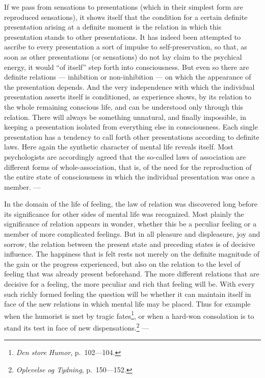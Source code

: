 \documentclass[12pt]{article}
\newcommand{\opage}[1]{\marginnote{\footnotesize\textit{[#1]}}}
\begin{document}
If we pass from sensations to presentations (which in their simplest form
are reproduced sensations), it shows itself that the condition for a certain
definite presentation arising at a definite moment is the relation in which
this presentation stands to other presentations. \opage{19}It has indeed been
attempted to ascribe to every presentation a sort of impulse to
self-preservation, so that, as soon as other presentations (or sensations)
do not lay claim to the psychical energy, it would ``of itself'' step forth
into consciousness. But even so there are definite relations --- inhibition
or non-inhibition --- on which the appearance of the presentation depends.
And the very independence with which the individual presentation asserts
itself is conditioned, as experience shows, by its relation to the whole
remaining conscious life, and can be understood only through this relation.
There will always be something unnatural, and finally impossible, in keeping
a presentation isolated from everything else in consciousness. Each single
presentation has a tendency to call forth other presentations according to
definite laws. Here again the synthetic character of mental life reveals
itself. Most psychologists are accordingly agreed that the so-called laws of
association are different forms of whole-association, that is, of the need
for the reproduction of the entire state of consciousness in which the
individual presentation was once a member. ---

In the domain of the life of feeling, the law of relation was discovered
long before its significance for other sides of mental life was recognized.
Most plainly the significance of relation appears in wonder, whether this be
a peculiar feeling or a member of more complicated feelings. But in all
pleasure and displeasure, joy and sorrow, the relation between the present
state and preceding states is of decisive influence. The happiness that is
felt rests not merely on the definite magnitude of the gain or the progress
experienced, but also on the relation to the level of feeling that was
already present beforehand. The more different relations that are decisive
for a feeling, the more peculiar and rich that feeling will \opage{20}be. With every
such richly formed feeling the question will be whether it can maintain
itself in face of the new relations in which mental life may be placed. Thus
for example when the humorist is met by tragic fates\footnote{\textit{Den
  store Humor}, p.~102---104.}, or when a hard-won consolation is to stand
its test in face of new dispensations.\footnote{\textit{Oplevelse og
  Tydning}, p.~150---152.} ---
\end{document}
